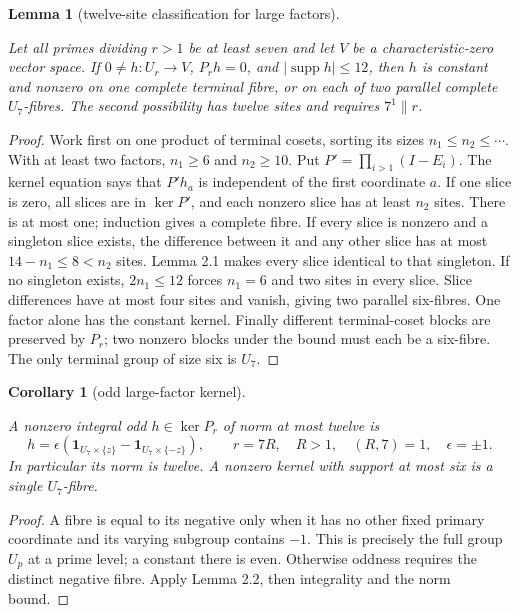 \documentclass[11pt]{amsart}
\numberwithin{theorem}{section}
\newtheorem{lemma}[theorem]{Lemma}
\newtheorem{corollary}[theorem]{Corollary}
\theoremstyle{remark}
\numberwithin{equation}{section}
\begin{document}
\begin{lemma}[twelve-site classification for large factors]\label{lemma:2.2}

Let all primes dividing \(r>1\) be at least seven and let \(V\) be a
characteristic-zero vector space. If \(0\ne h:U_r\to V\), \(P_rh=0\), and
\(|\operatorname{supp}h|\le12\), then \(h\) is constant and nonzero on one
complete terminal fibre, or on each of two parallel complete \(U_7\)-fibres.
The second possibility has twelve sites and requires \(7^1\parallel r\).

\end{lemma}
\begin{proof}

Work first on one product of terminal cosets, sorting its sizes
\(n_1\le n_2\le\cdots\). With at least two factors, \(n_1\ge6\) and
\(n_2\ge10\). Put \(P'=\prod_{i>1}(I-E_i)\). The kernel equation says that
\(P'h_a\) is independent of the first coordinate \(a\). If one slice is
zero, all slices are in \(\ker P'\), and each nonzero slice has at least
\(n_2\) sites. There is at most one; induction gives a complete fibre.
If every slice is nonzero and a singleton slice exists, the difference
between it and any other slice has at most \(14-n_1\le8<n_2\) sites.
Lemma 2.1 makes every slice identical to that singleton. If no singleton
exists, \(2n_1\le12\) forces \(n_1=6\) and two sites in every slice.
Slice differences have at most four sites and vanish, giving two parallel
six-fibres. One factor alone has the constant kernel. Finally different
terminal-coset blocks are preserved by \(P_r\); two nonzero blocks under
the bound must each be a six-fibre. The only terminal group of size six
is \(U_7\).
\end{proof}

\begin{corollary}[odd large-factor kernel]\label{corollary:2.3}

A nonzero integral odd \(h\in\ker P_r\) of norm at most twelve is
\[
h=\epsilon(\mathbf1_{U_7\times\{z\}}-
\mathbf1_{U_7\times\{-z\}}),
\qquad r=7R,\quad R>1,\quad (R,7)=1,\quad\epsilon=\pm1.
\]
In particular its norm is twelve. A nonzero kernel with support at most
six is a single \(U_7\)-fibre.

\end{corollary}
\begin{proof}

A fibre is equal to its negative only when it has no other fixed primary
coordinate and its varying subgroup contains \(-1\). This is precisely
the full group \(U_p\) at a prime level; a constant there is even.
Otherwise oddness requires the distinct negative fibre. Apply Lemma 2.2,
then integrality and the norm bound.
\end{proof}
\end{document}
